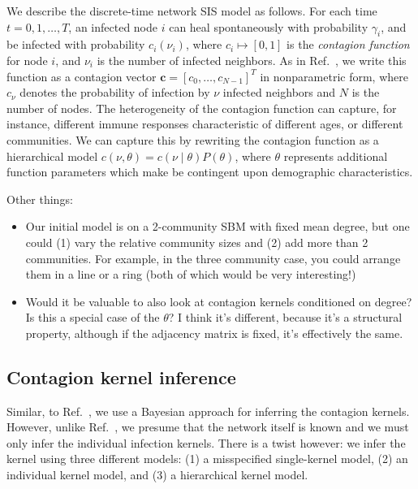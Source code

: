 \documentclass[10pt,aps,pre,twocolumn,nopacs,final,letterpaper,superscriptaddress,longbibliography]{revtex4-2}
\newcommand{\boldc}{\bm{c}}
\begin{document}
We describe the discrete-time network SIS model as follows.
For each time $t=0, 1,\dots, T$, an infected node $i$ can heal spontaneously with probability $\gamma_i$, and be infected with probability $c_i(\nu_i)$, where $c_i\mapsto[0, 1]$ is the \textit{contagion function} for node $i$, and $\nu_i$ is the number of infected neighbors.
As in Ref.~\cite{landry_reconstructing_2024}, we write this function as a contagion vector $\boldc = [c_0, \dots, c_{N-1}]^T$  in nonparametric form, where $c_\nu$ denotes the probability of infection by $\nu$ infected neighbors and $N$ is the number of nodes.
The heterogeneity of the contagion function can capture, for instance, different immune responses characteristic of different ages, or different communities.
We can capture this by rewriting the contagion function as a hierarchical model $c(\nu, \theta) = c(\nu \mid \theta)P(\theta)$, where $\theta$ represents additional function parameters which make be contingent upon demographic characteristics.

Other things:
\begin{itemize}
    \item Our initial model is on a 2-community SBM with fixed mean degree, but one could (1) vary the relative community sizes and (2) add more than 2 communities. For example, in the three community case, you could arrange them in a line or a ring (both of which would be very interesting!)
    \item Would it be valuable to also look at contagion kernels conditioned on degree? Is this a special case of the $\theta$? I think it's different, because it's a structural property, although if the adjacency matrix is fixed, it's effectively the same.
\end{itemize}

\subsection{Contagion kernel inference}

Similar, to Ref.~\cite{landry_reconstructing_2024}, we use a Bayesian approach for inferring the contagion kernels. However, unlike Ref.~\cite{landry_reconstructing_2024}, we presume that the network itself is known and we must only infer the individual infection kernels.
There is a twist however: we infer the kernel using three different models: (1) a misspecified single-kernel model, (2) an individual kernel model, and (3) a hierarchical kernel model.
\end{document}
